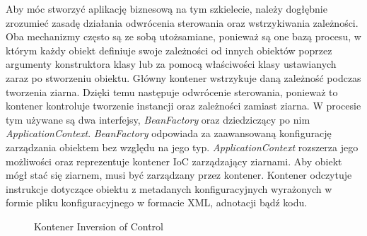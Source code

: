 Aby móc stworzyć aplikację biznesową na tym szkielecie, należy dogłębnie zrozumieć zasadę działania odwrócenia sterowania oraz wstrzykiwania zależności. Oba mechanizmy często są ze sobą utożsamiane, ponieważ są one bazą procesu, w którym każdy obiekt definiuje swoje zależności od innych obiektów poprzez argumenty konstruktora klasy lub za pomocą właściwości klasy ustawianych zaraz po stworzeniu obiektu. Główny kontener wstrzykuje daną zależność podczas tworzenia ziarna. Dzięki temu następuje odwrócenie sterowania, ponieważ to kontener kontroluje tworzenie instancji oraz zależności zamiast ziarna. W procesie tym używane są dwa interfejsy, \textit{BeanFactory} oraz dziedziczący po nim \textit{ApplicationContext}. \textit{BeanFactory} odpowiada za zaawansowaną konfigurację zarządzania obiektem bez względu na jego typ. \textit{ApplicationContext} rozszerza jego możliwości oraz reprezentuje kontener IoC zarządzający ziarnami. Aby obiekt mógł stać się ziarnem, musi być zarządzany przez kontener. Kontener odczytuje instrukcje dotyczące obiektu z metadanych konfiguracyjnych wyrażonych w formie pliku konfiguracyjnego w formacie XML, adnotacji bądź kodu.



	\begin{figure}[h!]
		\caption{Kontener Inversion of Control}
		\centering
		\label{fig:inversionOfControl}
	\end{figure}



